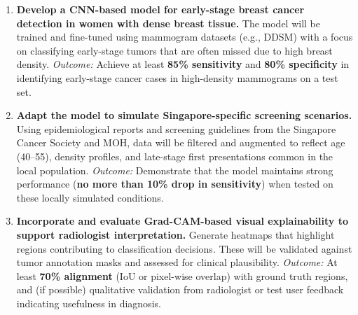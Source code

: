 \documentclass[12pt]{article}
\begin{document}
\begin{enumerate}[label=\arabic*.]
  \item \textbf{Develop a CNN-based model for early-stage breast cancer detection in women with dense breast tissue.}  
  The model will be trained and fine-tuned using mammogram datasets (e.g., DDSM) with a focus on classifying early-stage tumors that are often missed due to high breast density.  
  \textit{Outcome:} Achieve at least \textbf{85\% sensitivity} and \textbf{80\% specificity} in identifying early-stage cancer cases in high-density mammograms on a test set.

  \item \textbf{Adapt the model to simulate Singapore-specific screening scenarios.}  
  Using epidemiological reports and screening guidelines from the Singapore Cancer Society and MOH, data will be filtered and augmented to reflect age (40–55), density profiles, and late-stage first presentations common in the local population.  
  \textit{Outcome:} Demonstrate that the model maintains strong performance (\textbf{no more than 10\% drop in sensitivity}) when tested on these locally simulated conditions.

  \item \textbf{Incorporate and evaluate Grad-CAM-based visual explainability to support radiologist interpretation.}  
  Generate heatmaps that highlight regions contributing to classification decisions. These will be validated against tumor annotation masks and assessed for clinical plausibility.  
  \textit{Outcome:} At least \textbf{70\% alignment} (IoU or pixel-wise overlap) with ground truth regions, and (if possible) qualitative validation from radiologist or test user feedback indicating usefulness in diagnosis.
\end{enumerate}
\end{document}

